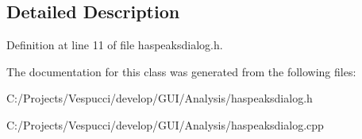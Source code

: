 \subsection{Detailed Description}


Definition at line 11 of file haspeaksdialog.\+h.



The documentation for this class was generated from the following files\+:\begin{DoxyCompactItemize}
\item 
C\+:/\+Projects/\+Vespucci/develop/\+G\+U\+I/\+Analysis/haspeaksdialog.\+h\item 
C\+:/\+Projects/\+Vespucci/develop/\+G\+U\+I/\+Analysis/haspeaksdialog.\+cpp\end{DoxyCompactItemize}

